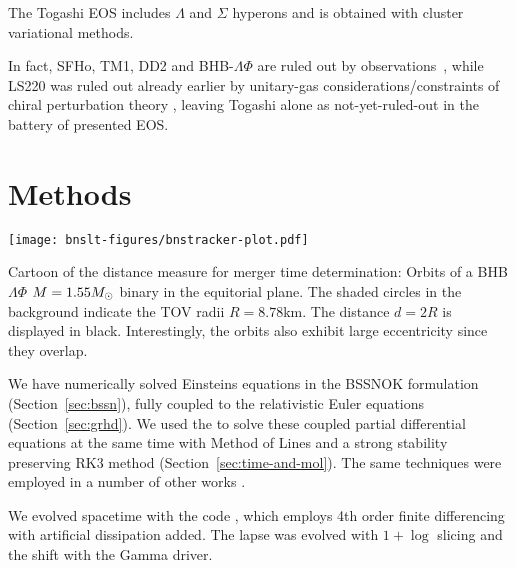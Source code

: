 The Togashi EOS \cite{Togashi2016,Togashi2017} includes $\Lambda$ and $\Sigma$
hyperons and is obtained with cluster variational methods.

In fact, SFHo, TM1, DD2 and BHB-$\Lambda\Phi$ are ruled out by
observations~\cite{Radice2017b}, while LS220 was ruled out already earlier by
unitary-gas considerations/\-con\-straints of chiral perturbation theory
\cite{Kolomeitsev2016}, leaving Togashi alone as 
not-yet-ruled-out in the battery of presented EOS.

\section{Methods}
\begin{marginfigure}
	\hspace*{-.6cm}
	\texttt{[image: bnslt-figures/bnstracker-plot.pdf]}
	\caption[
	2D Cartoon, showing the inspiral of two NS with trajectories, 
	\exclusive
	]{
		Cartoon of the distance measure for merger time determination:
		Orbits of a BHB$\Lambda\Phi$ $M=1.55M_{\odot}$ binary in the equitorial
		plane. The shaded circles in the background indicate the TOV radii
		$R=8.78$km. The distance $d=2R$ is displayed in black.
		Interestingly, the orbits also exhibit large 
		eccentricity since they overlap.
	}
	\label{fig:bnstracker}
\end{marginfigure}
We have numerically solved Einsteins equations in the BSSNOK
formulation (Section~\ref{sec:bssn}), fully coupled to 
the relativistic Euler equations (Section~\ref{sec:grhd}).
We used the  \cite{loeffler_2011_et, ET2013, 
EinsteinToolkit:web} to solve these coupled partial differential equations at 
the same time with Method of Lines and a strong stability preserving RK3 method
(Section~\ref{sec:time-and-mol}).
The same techniques were employed in a number of other works
\cite{Hanauske2017,Bovard2017}.

We evolved spacetime with the  code \cite{Baumgarte99,Baumgarte2010, 
Shibata95, Brown09, Reisswig:2011a}, which employs
4th order finite differencing with artificial dissipation added. The lapse was 
evolved with $1+\log$ slicing and the shift with the Gamma
driver.

